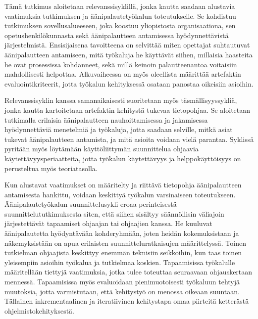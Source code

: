 \documentclass[utf8]{gradu3}
\begin{document}
Tämä tutkimus aloitetaan relevanssisyklillä, jonka kautta saadaan alustavia vaatimuksia tutkimuksen ja äänipalautetyökalun toteutukselle. Se kohdistuu tutkimuksen sovellusalueeseen, joka koostuu yliopistosta organisaationa, sen opetushenkilökunnasta sekä äänipalautteen antamisessa hyödynnettävistä järjestelmistä. Ensisijaisena tavoitteena on selvittää miten opettajat suhtautuvat äänipalautteen antamiseen, mitä työkaluja he käyttävät siihen, millaisia haasteita he ovat prosessissa kohdanneet, sekä millä keinoin palautteenantoa voitaisiin mahdollisesti helpottaa. Alkuvaiheessa on myös oleellista määrittää artefaktin evaluointikriteerit, jotta työkalun kehityksessä osataan panostaa oikeisiin asioihin.

Relevanssisyklin kanssa samanaikaisesti suoritetaan myös täsmällisyyssykliä, jonka kautta kartoitetaan artefaktin kehitystä tukevaa tietopohjaa. Se aloitetaan tutkimalla erilaisia äänipalautteen nauhoittamisessa ja jakamisessa hyödynnettäviä menetelmiä ja työkaluja, jotta saadaan selville, mitkä asiat tukevat äänipalautteen antamista, ja mitä asioita voidaan vielä parantaa. Syklissä pyritään myös löytämään käyttöliittymän suunnittelua ohjaavia käytettävyysperiaatteita, jotta työkalun käytettävyys ja helppokäyttöisyys on perusteltua myös teoriatasolla. 

Kun alustavat vaatimukset on määritelty ja riittävä tietopohja äänipalautteen antamisesta hankittu, voidaan keskittyä työkalun varsinaiseen toteutukseen. Äänipalautetyökalun suunnittelusykli eroaa perinteisestä suunnittelututkimuksesta siten, että siihen sisältyy säännöllisin väliajoin järjestettävät tapaamiset ohjaajan tai ohjaajien kanssa. He kuuluvat äänipalautetta hyödyntävään kohderyhmään, joten heidän kokemuksistaan ja näkemyksistään on apua erilaisten suunnitteluratkaisujen määrittelyssä. Toinen tutkielman ohjaajista keskittyy enemmän teknisiin seikkoihin, kun taas toinen yleisempiin asioihin työkalua ja tutkielmaa koskien. Tapaamisissa työkalulle määritellään tiettyjä vaatimuksia, jotka tulee toteuttaa seuraavaan ohjauskertaan mennessä. Tapaamisissa myös evaluoidaan pienimuotoisesti työkaluun tehtyjä muutoksia, jotta varmistutaan, että kehitystyö on menossa oikeaan suuntaan. Tällainen inkrementaalinen ja iteratiivinen kehitystapa omaa piirteitä ketterästä ohjelmistokehityksestä.
\end{document}
